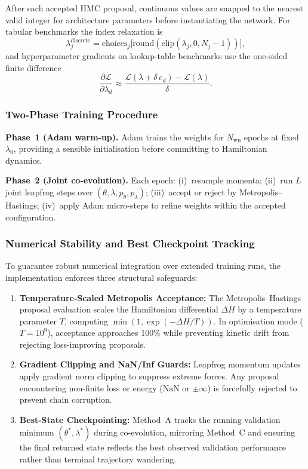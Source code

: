 \documentclass[11pt]{article}
\theoremstyle{definition}
\begin{document}
After each accepted HMC proposal, continuous values are snapped to
the nearest valid integer for architecture parameters before
instantiating the network. For tabular benchmarks the index
relaxation is
\begin{equation}
\lambda_j^{\mathrm{discrete}} = \mathrm{choices}_j\bigl[
   \mathrm{round}(\mathrm{clip}(\lambda_j, 0, N_j-1))\bigr],
\label{eq:index_relax}
\end{equation}
and hyperparameter gradients on lookup-table benchmarks use the
one-sided finite difference
\begin{equation}
\frac{\partial\mathcal{L}}{\partial\lambda_d}
  \approx \frac{\mathcal{L}(\lambda + \delta\,e_d) -
                \mathcal{L}(\lambda)}{\delta}.
\label{eq:fd_grad}
\end{equation}

\subsubsection{Two-Phase Training Procedure}

\textbf{Phase~1 (Adam warm-up).} Adam trains the weights for
$N_{\mathrm{wu}}$ epochs at fixed $\lambda_0$, providing a sensible
initialisation before committing to Hamiltonian dynamics.

\textbf{Phase~2 (Joint co-evolution).} Each epoch: (i)~resample
momenta; (ii)~run $L$ joint leapfrog steps over
$(\theta,\lambda,p_\theta,p_\lambda)$; (iii)~accept or reject by
Metropolis--Hastings; (iv)~apply Adam micro-steps to refine weights
within the accepted configuration.

\subsubsection{Numerical Stability and Best Checkpoint Tracking}
\label{subsubsec:stability}

To guarantee robust numerical integration over extended training runs, the implementation enforces three structural safeguards:
\begin{enumerate}[leftmargin=*]
  \item \textbf{Temperature-Scaled Metropolis Acceptance:} The Metropolis--Hastings proposal evaluation scales the Hamiltonian differential $\Delta H$ by a temperature parameter $T$, computing $\min(1, \exp(-\Delta H / T))$. In optimisation mode ($T=10^9$), acceptance approaches 100\% while preventing kinetic drift from rejecting loss-improving proposals.
  \item \textbf{Gradient Clipping and NaN/Inf Guards:} Leapfrog momentum updates apply gradient norm clipping to suppress extreme forces. Any proposal encountering non-finite loss or energy ($\text{NaN}$ or $\pm\infty$) is forcefully rejected to prevent chain corruption.
  \item \textbf{Best-State Checkpointing:} Method~A tracks the running validation minimum $(\theta^*, \lambda^*)$ during co-evolution, mirroring Method~C and ensuring the final returned state reflects the best observed validation performance rather than terminal trajectory wandering.
\end{enumerate}
\end{document}
